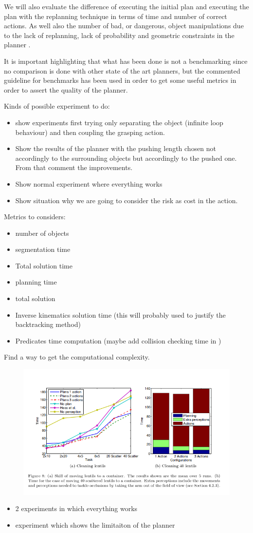 We will also evaluate the difference of executing the initial plan and executing the plan with the replanning technique in terms of time and number of correct actions. As well also the number of bad, or dangerous, object manipulations due to the lack of replanning, lack of probability and geometric constraints in the planner . 

It is important highlighting that what has been done is not a benchmarking since no comparison is done with other state of the art planners, but the commented guideline for benchmarks has been used in order to get some useful metrics in order to assert the quality of the planner. 

Kinds of possible experiment to do:
\begin{itemize}
\item show experiments first trying only separating the object (infinite loop behaviour) and then coupling the grasping action. 
\item Show the results of the planner with the pushing length chosen not accordingly to the surrounding objects but accordingly to the pushed one. From that comment the improvements.
\item Show normal experiment where everything works
\item Show situation why we are going to consider the risk as cost in the action. 
\end{itemize}

Metrics to considers:
\begin{itemize}
\item number of objects
\item segmentation time
\item Total solution time
\item planning time
\item total solution
\item Inverse kinematics solution time (this will probably used to justify the backtracking method)
\item Predicates time computation (maybe add collision checking time in )
\end{itemize}


Find a way to get the computational complexity. 

\begin{figure}
\centering
\includegraphics[width=\textwidth]{Img/general/experiments.png}
\end{figure}

\begin{itemize}
\item 2 experiments in which everything works
\item experiment which shows the limitaiton of the planner
\end{itemize}

\fi